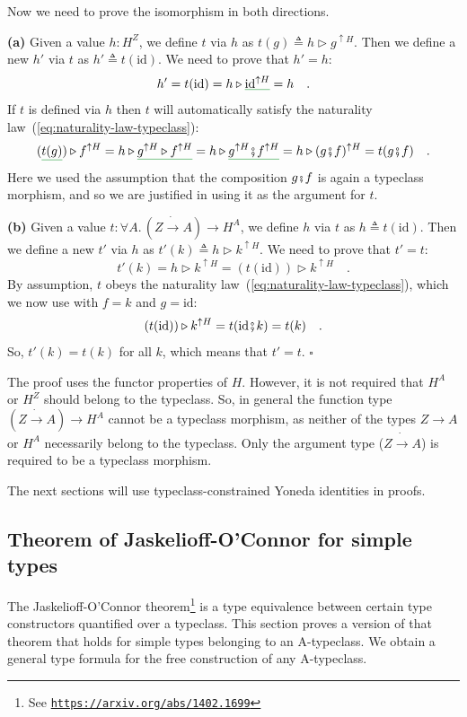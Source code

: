 Now we need to prove the isomorphism in both directions. 

\textbf{(a)} Given a value $h:H^{Z}$, we define $t$ via $h$ as
$t(g)\triangleq h\triangleright g^{\uparrow H}$. Then we define a
new $h'$ via $t$ as $h'\triangleq t(\text{id})$. We need to prove
that $h'=h$:
\[
h'=t(\text{id})=h\triangleright\gunderline{\text{id}^{\uparrow H}}=h\quad.
\]
If $t$ is defined via $h$ then $t$ will automatically satisfy the
naturality law~(\ref{eq:naturality-law-typeclass}):
\[
(\gunderline{t(g)})\triangleright f^{\uparrow H}=h\triangleright\gunderline{g^{\uparrow H}\triangleright f^{\uparrow H}}=h\triangleright\gunderline{g^{\uparrow H}\bef f^{\uparrow H}}=h\triangleright(g\bef f)^{\uparrow H}=t(g\bef f)\quad.
\]
Here we used the assumption that the composition $g\bef f$ is again
a typeclass morphism, and so we are justified in using it as the argument
for $t$.

\textbf{(b)} Given a value $t:\forall A.\,(Z\dot{\rightarrow}A)\rightarrow H^{A}$,
we define $h$ via $t$ as $h\triangleq t(\text{id})$. Then we define
a new $t'$ via $h$ as $t'(k)\triangleq h\triangleright k^{\uparrow H}$.
We need to prove that $t'=t$:
\[
t'(k)=h\triangleright k^{\uparrow H}=(t(\text{id}))\triangleright k^{\uparrow H}\quad.
\]
By assumption, $t$ obeys the naturality law~(\ref{eq:naturality-law-typeclass}),
which we now use with $f=k$ and $g=\text{id}$:
\[
(t(\text{id}))\triangleright k^{\uparrow H}=t(\text{id}\bef k)=t(k)\quad.
\]
So, $t'(k)=t(k)$ for all $k$, which means that $t'=t$. $\square$

The proof uses the functor properties of $H$. However, it is not
required that $H^{A}$ or $H^{Z}$ should belong to the typeclass.
So, in general the function type $(Z\dot{\rightarrow}A)\rightarrow H^{A}$
cannot be a typeclass morphism, as neither of the types $Z\rightarrow A$
or $H^{A}$ necessarily belong to the typeclass. Only the argument
type ($Z\dot{\rightarrow}A$) is required to be a typeclass morphism.

The next sections will use typeclass-constrained Yoneda identities
in proofs.

\subsection{Theorem of Jaskelioff-O\textsf{'}Connor for simple types}

The Jaskelioff-O\textsf{'}Connor theorem\footnote{See \texttt{\href{https://arxiv.org/abs/1402.1699}{https://arxiv.org/abs/1402.1699}}}
is a type equivalence between certain type constructors quantified
over a typeclass. This section proves a version of that theorem that
holds for simple types belonging to an A-typeclass. We obtain a general
type formula for the free construction of any A-typeclass.

